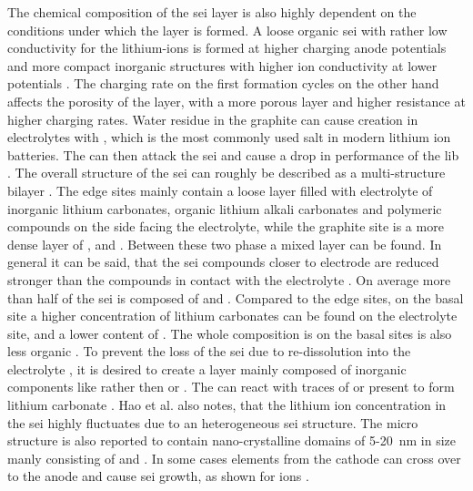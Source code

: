 The chemical composition of the \gls{sei} layer is also highly dependent on the conditions under which the layer is formed. A loose organic \gls{sei} with rather low conductivity for the lithium-ions is formed at higher charging anode potentials and more compact inorganic structures with higher ion conductivity at lower potentials \cite{Bhattacharya.2012,Tran.1996}. The charging rate on the first formation cycles on the other hand affects the porosity of the layer, with a more porous layer and higher resistance at higher charging rates. Water residue in the graphite can cause  creation in electrolytes with , which is the most commonly used salt in modern lithium ion batteries. The  can then attack the \gls{sei} and cause a drop in performance of the \gls{lib} \cite{An.2016}. The overall structure of the \gls{sei} can roughly be described as a multi-structure bilayer \cite{An.2016,Wang.2018,Bhattacharya.2012,Lin.2016}. The edge sites mainly contain a loose layer filled with electrolyte of inorganic lithium carbonates, organic lithium alkali carbonates and polymeric compounds on the side facing the electrolyte, while the graphite site is a more dense layer of ,  and  \cite{Peled.1998, Eshkenazia.2004}. Between these two phase a mixed layer can be found. In general it can be said, that the \gls{sei} compounds closer to electrode are reduced stronger than the compounds in contact with the electrolyte \cite{Seidl.2016}.  On average more than half of the \gls{sei} is composed of  and . Compared to the edge sites, on the basal site a higher concentration of lithium carbonates can be found on the electrolyte site, and a lower content of  \cite{Peled.1998,Eshkenazia.2004}. The whole composition is on the basal sites is also less organic \cite{Seidl.2016}. To prevent the loss of the \gls{sei} due to re-dissolution into the electrolyte \cite{Wang.2018}, it is desired to create a layer mainly composed of inorganic components like  rather then  or . The  can react with traces of  or  present to form lithium carbonate \cite{Lu.2008}. Hao et al.\cite{Hao.2017} also notes, that the lithium ion concentration in the \gls{sei} highly fluctuates due to an heterogeneous \gls{sei} structure. The micro structure is also reported to contain nano-crystalline domains of 5-\SI{20}{\nano\meter} in size manly consisting of  and  \cite{Bhattacharya.2012}. In some cases elements from the cathode can cross over to the anode and cause \gls{sei} growth, as shown for  ions \cite{Leung.2017}. \par
